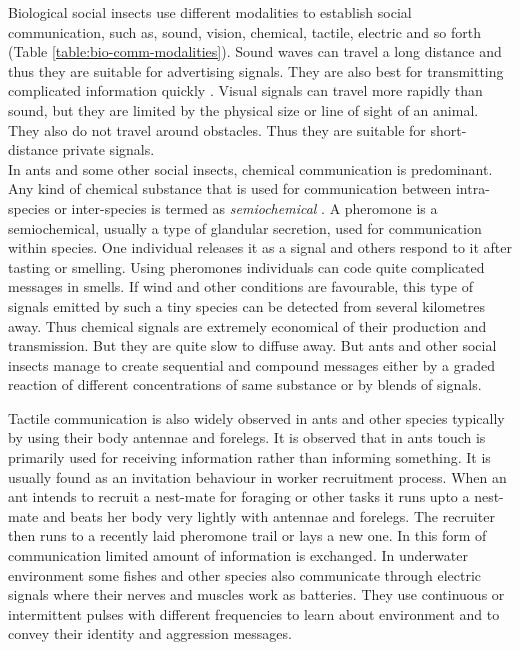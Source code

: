 \documentclass{intech}
\begin{document}
Biological social insects use different modalities to establish social communication, such as, sound, vision, chemical, tactile,  electric and so forth (Table \ref{table:bio-comm-modalities}).  Sound waves can travel a long distance and thus they are suitable for advertising signals. They are also best for transmitting complicated information quickly \citep{Slater1986}. Visual signals can travel more rapidly than sound, but they are limited by the physical size or line of sight of an animal. They also do not travel around obstacles. Thus they are suitable for short-distance private signals.\\
%
In ants and some other social insects, chemical communication is predominant. Any kind of chemical substance that is used for communication between intra-species or inter-species is termed as {\em semiochemical} \citep{Holldobler1990}. A pheromone is a semiochemical, usually a type of glandular secretion, used for communication within species. One individual releases it as a signal and others respond to it after tasting or smelling. Using pheromones individuals can code quite complicated messages in smells. If wind and other conditions are favourable,  this type of signals emitted by such a tiny species can be detected from several kilometres away. Thus chemical signals are extremely economical of their production and transmission. But they are quite slow to diffuse away. But ants and other social insects manage to create sequential and compound messages either by a graded reaction of different concentrations of same substance or by blends of signals.

Tactile communication is also widely observed in ants and other species typically by using their body antennae and forelegs. It is observed that in ants touch is primarily used  for receiving information rather than informing something. It is usually found as an invitation behaviour in worker recruitment process. When an ant intends to recruit a nest-mate for foraging or other tasks it runs upto a nest-mate and beats her body very lightly with  antennae and forelegs. The recruiter then runs to a recently laid pheromone trail or lays a new one. In this form of communication limited amount of information is exchanged. In underwater environment some fishes and other species also communicate through electric signals where their nerves and muscles work as batteries. They use continuous or intermittent pulses with  different frequencies to learn about environment and to convey their identity and aggression messages.
\end{document}

